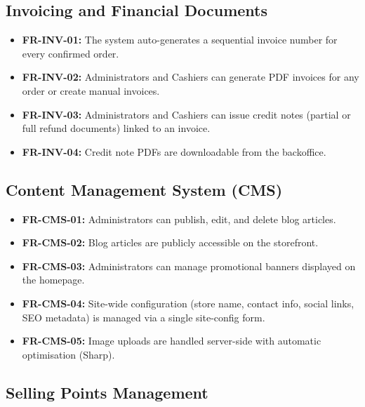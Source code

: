 \subsection{Invoicing and Financial Documents}

\begin{itemize}
    \item \textbf{FR-INV-01:} The system auto-generates a sequential invoice number for every confirmed order.
    \item \textbf{FR-INV-02:} Administrators and Cashiers can generate PDF invoices for any order or create manual invoices.
    \item \textbf{FR-INV-03:} Administrators and Cashiers can issue credit notes (partial or full refund documents) linked to an invoice.
    \item \textbf{FR-INV-04:} Credit note PDFs are downloadable from the backoffice.
\end{itemize}

\subsection{Content Management System (CMS)}

\begin{itemize}
    \item \textbf{FR-CMS-01:} Administrators can publish, edit, and delete blog articles.
    \item \textbf{FR-CMS-02:} Blog articles are publicly accessible on the storefront.
    \item \textbf{FR-CMS-03:} Administrators can manage promotional banners displayed on the homepage.
    \item \textbf{FR-CMS-04:} Site-wide configuration (store name, contact info, social links, SEO metadata) is managed via a single site-config form.
    \item \textbf{FR-CMS-05:} Image uploads are handled server-side with automatic optimisation (Sharp).
\end{itemize}
\subsection{Selling Points Management}

